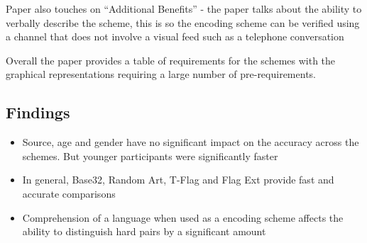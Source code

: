 Paper also touches on ``Additional Benefits'' - the paper talks about the ability to verbally describe the scheme, this is so the encoding scheme can be verified using a channel that does not involve a visual feed such as a telephone conversation

Overall the paper provides a table of requirements for the schemes with the graphical representations requiring a large number of pre-requirements.

\subsection{Findings}
\begin{itemize}
    \item Source, age and gender have no significant impact on the accuracy across the schemes. But younger participants were significantly faster
    \item In general, Base32, Random Art, T-Flag and Flag Ext provide fast and accurate comparisons
    \item Comprehension of a language when used as a encoding scheme affects the ability to distinguish hard pairs by a significant amount
\end{itemize}
